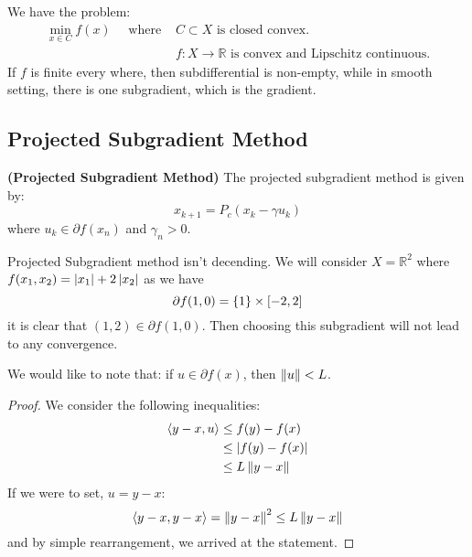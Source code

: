 \begin{remark}
    We have the problem:
    \begin{equation*}
    \begin{aligned}
        \min_{x\in C} f(x) \quad \text{ where } &C\subset X \text{ is closed convex.} \\
        &f:X\rightarrow \mathbb{R}\text{ is convex and Lipschitz continuous.}
    \end{aligned}
    \end{equation*}
    If $f$ is finite every where, then subdifferential is non-empty, while in smooth setting, there is one subgradient, which is the gradient.
\end{remark}

\subsection{Projected Subgradient Method}

\begin{definition}{\textbf{(Projected Subgradient Method)}}
    The projected subgradient method is given by:
    \begin{equation*}
        x_{k+1} = P_c(x_k-\gamma u_k)
    \end{equation*}
    where $u_k\in\partial f(x_n)$ and $\gamma_n>0$.
\end{definition}

\begin{remark}
    Projected Subgradient method isn't decending. We will consider $X = \mathbb{R}^2$ where $f(x_1, x_2) = \left| x_1 \right| + 2\left| x_2 \right|$ as we have 
    \begin{equation*}
        \partial f(1, 0) = \left\{ 1 \right\}\times[-2, 2] 
    \end{equation*}
    it is clear that $(1, 2)\in\partial f(1, 0)$. Then choosing this subgradient will not lead to any convergence.
\end{remark}

\begin{lemma}
    We would like to note that: if $u\in\partial f(x)$, then $\left\lVert u\right\rVert < L$. 
\end{lemma}
\begin{proof}
    We consider the following inequalities:
    \begin{equation*}
    \begin{aligned}
        \left\langle y-x, u \right\rangle &\le f(y) - f(x) \\
        &\le\left| f(y)-f(x) \right| \\
        &\le L\left\lVert y-x\right\rVert
    \end{aligned}
    \end{equation*}
    If we were to set, $u = y-x$:
    \begin{equation*}
        \left\langle y-x, y-x \right\rangle = \left\lVert y-x\right\rVert^2 \le L\left\lVert y-x\right\rVert
    \end{equation*}
    and by simple rearrangement, we arrived at the statement.
\end{proof}

